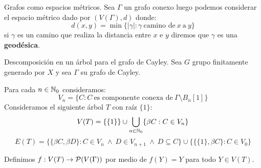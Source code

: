 \documentclass[aspectratio=169, 10pt]{beamer}
\begin{document}
	\begin{frame}[fragile]{Grafos como espacios métricos.}
		Sea $\Gamma$ un grafo conexo luego podemos considerar el espacio métrico dado por $(V(\Gamma), d)$ donde:
		\[
			d(x,y) = \min \{ |\gamma| : \gamma \ \text{camino de} \ x  \ \text{a} \ y  \}	
		\]
		\pause 
		si $\gamma$ es un camino que realiza la distancia entre $x$ e $y$ diremos que $\gamma$ es una \textbf{geodésica}.
		\pause 
	\end{frame}

	\begin{frame}[fragile]{Descomposición en un árbol para el grafo de Cayley.}
		Sea $G$ grupo finitamente generado por $X$ y sea $\Gamma$ su grafo de Cayley.
		
		\pause 
		Para cada $n \in \mathbb{N}_{0}$ consideramos:
		\[
			V_{n} = \{C : C \ \text{es componente conexa de} \ \Gamma \setminus B_{n}[1]\}	
		\]
		\pause 
		Consideramos el siguiente árbol $T$ con raíz $\{1\}$:
		\pause 
		\[
			V(T) = \{ \{1\}\} \cup \bigcup_{n \in \mathbb{N}_{0}}  \{ \beta C : C \in V_{n} \}
		\]
		\pause 
		\[
			E(T) = \{ \{\beta C, \beta D\} : C \in V_{n} \ \land \ D \in V_{n+1} \ \land \ D \subseteq C\} \cup 
			\{ \{\{1\}, \beta C\} : C \in V_{0} \}
		\]
		\pause 
		
		Definimos $f: V(T) \to {\cal{P}}(V(\Gamma))$ por medio de $f(Y) = Y$ para todo $Y \in V(T)$.
		\pause 
		
		
	\end{frame}
\end{document}
